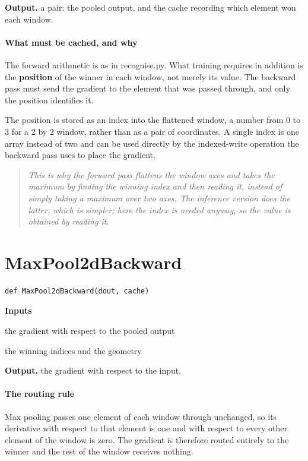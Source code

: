 \noindent\textbf{Output.} a pair: the pooled output, and the cache recording which element won each window.


\paragraph{What must be cached, and why}
The forward arithmetic is as in recognise.py. What training requires in addition is the \textbf{position} of the winner in each window, not merely its value. The backward pass must send the gradient to the element that was passed through, and only the position identifies it.

The position is stored as an index into the flattened window, a number from 0 to 3 for a 2 by 2 window, rather than as a pair of coordinates. A single index is one array instead of two and can be used directly by the indexed-write operation the backward pass uses to place the gradient.


\begin{quote}\small\itshape This is why the forward pass flattens the window axes and takes the maximum by finding the winning index and then reading it, instead of simply taking a maximum over two axes. The inference version does the latter, which is simpler; here the index is needed anyway, so the value is obtained by reading it.\end{quote}

\section{MaxPool2dBackward}
\begin{lstlisting}[style=sig]
def MaxPool2dBackward(dout, cache)
\end{lstlisting}

\noindent\textbf{Inputs}
\begin{description}[leftmargin=2.2em,style=nextline,font=\normalfont\ttfamily]\setlength\itemsep{1pt}
  \item[{dout}] \normalfont the gradient with respect to the pooled output
  \item[{cache}] \normalfont the winning indices and the geometry
\end{description}

\noindent\textbf{Output.} the gradient with respect to the input.


\paragraph{The routing rule}
Max pooling passes one element of each window through unchanged, so its derivative with respect to that element is one and with respect to every other element of the window is zero. The gradient is therefore routed entirely to the winner and the rest of the window receives nothing.


